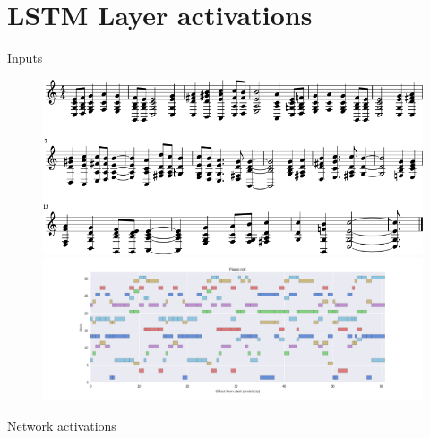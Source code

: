 \documentclass[dissertation.tex]{subfiles}
\begin{document}
\section{LSTM Layer activations}

Inputs

\begin{figure}[htpb]
    \centering
    \includegraphics[width=1.0\linewidth]{Figures/model-analysis-input-score-1.png}
    \includegraphics[width=1.0\linewidth]{Figures/model-analysis-input-piano-roll.png}
    \caption{}
    \label{fig:}
\end{figure}

Network activations
\end{document}
